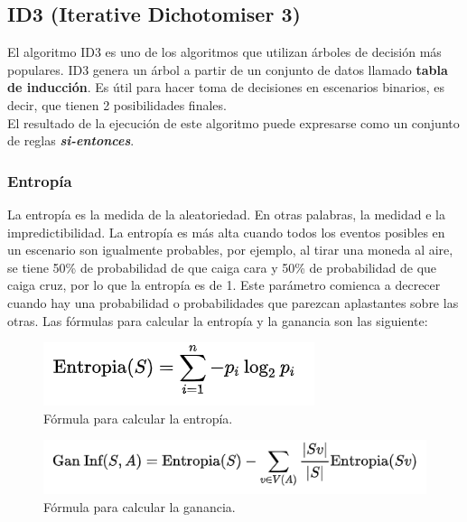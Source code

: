 \newpage
\subsection{ID3 (Iterative Dichotomiser 3)} \label{id3}

El algoritmo ID3 es uno de los algoritmos que utilizan árboles de decisión más populares. ID3 genera un árbol a partir de un conjunto de datos llamado \textbf{tabla de inducción}. Es útil para hacer toma de decisiones en escenarios binarios, es decir, que tienen 2 posibilidades finales.\\

El resultado de la ejecución de este algoritmo puede expresarse como un conjunto de reglas \textbf{\textit{si-entonces}}.

\subsubsection{Entropía}
La entropía es la medida de la aleatoriedad. En otras palabras, la medidad e la impredictibilidad. La entropía es más alta cuando todos los eventos posibles en un escenario son igualmente probables, por ejemplo, al tirar una moneda al aire, se tiene 50\% de probabilidad de que caiga cara y 50\% de probabilidad de que caiga cruz, por lo que la entropía es de 1. Este parámetro comienca a decrecer cuando hay una probabilidad o probabilidades que parezcan aplastantes sobre las otras. Las fórmulas para calcular la entropía y la ganancia son las siguiente:\\

\begin{figure}[!htbp]
	\hypertarget{fig:formula-entropia}{\hspace{1pt}}
	\begin{center}
		\includegraphics{capitulo2/images/formula-entropia.png}
		\caption{Fórmula para calcular la entropía.}
		\label{fig:formula-entropia}
	\end{center}
\end{figure}

\begin{figure}[!htbp]
	\hypertarget{fig:formula-ganancia}{\hspace{1pt}}
	\begin{center}
		\includegraphics{capitulo2/images/formula-ganancia.png}
		\caption{Fórmula para calcular la ganancia.}
		\label{fig:formula-ganancia}
	\end{center}
\end{figure}


